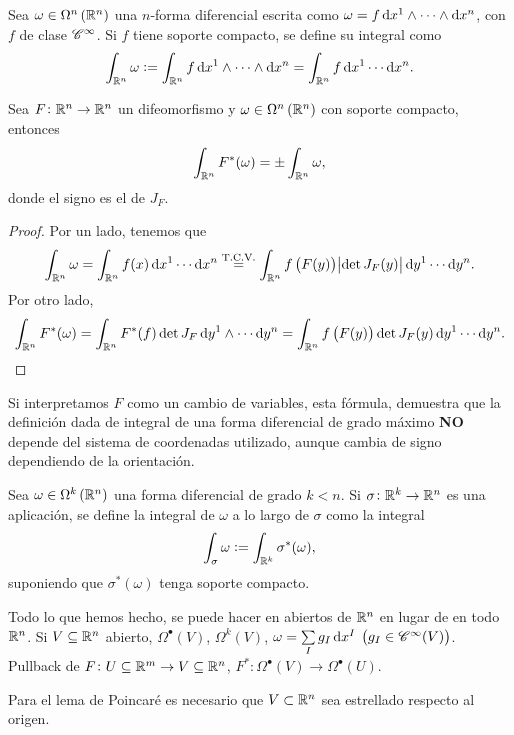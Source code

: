\begin{defi}
    Sea $\omega \in \Omega^n\left( \mathbb{R}^n \right)$ una $n$-forma diferencial escrita como $\omega = f \dif x^1 \wedge \cdots \wedge \dif x^n$,
    con $f$ de clase $\mathscr{C}^\infty$. Si $f$ tiene soporte compacto, se define su integral como
    \[
        \int_{\real^n} \omega := \int_{\real^n} f\dif x^1 \wedge \cdots \wedge \dif x^n = \int_{\real^n} f \dif x^1 \cdots \dif x^n.
    \]
\end{defi}

\begin{prop}
    Sea $F \colon \mathbb{R}^n \to \mathbb{R}^n$ un difeomorfismo y $\omega \in \Omega^n\left( \mathbb{R}^n \right)$ con soporte compacto, entonces
    \[
        \int_{\mathbb{R}^n} F^\ast(\omega) = \pm \int_{\mathbb{R}^n} \omega,
    \]
    donde el signo es el de $J_F$.
\end{prop}

\begin{proof}
    Por un lado, tenemos que
    \[
        \int_{\real^n} \omega = \int_{\real^n} f(x) \dif x^1 \cdots \dif x^n \stackrel{\text{T.C.V.}}{=} \int_{\real^n}
        f\left( F(y) \right) \abs{\det J_F(y)} \dif y^1 \cdots \dif y^n.
    \]
    Por otro lado,
    \[
        \int_{\real^n} F^\ast(\omega) = \int_{\real^n} F^\ast (f) \det J_F \dif y^1 \wedge \cdots \dif y^n =
        \int_{\real^n} f\left( F(y) \right) \det J_F(y) \dif y^1 \cdots \dif y^n.
    \]
\end{proof}

\begin{obs}
    Si interpretamos $F$ como un cambio de variables, esta fórmula, demuestra que la definición dada de integral de una forma diferencial
    de grado máximo \textbf{NO} depende del sistema de coordenadas utilizado, aunque cambia de signo dependiendo de la orientación.
\end{obs}

\begin{defi}
    Sea $\omega \in \Omega^k\left( \mathbb{R}^n \right)$ una forma diferencial de grado $k < n$. Si $\sigma \colon \mathbb{R}^k \to \mathbb{R}^n$ es
    una aplicación, se define la integral de $\omega$ a lo largo de $\sigma$ como la integral
    \[
        \int_{\sigma} \omega := \int_{\mathbb{R}^k} \sigma^\ast(\omega),
    \]
    suponiendo que $\sigma^\ast(\omega)$ tenga soporte compacto.
\end{defi}

\begin{obs}
    Todo lo que hemos hecho, se puede hacer en abiertos de $\mathbb{R}^n$ en lugar de en todo $\mathbb{R}^n$. Si $V \subseteq \mathbb{R}^n$ abierto,
    $\Omega^\bullet(V)$, $\Omega^k(V)$, $\omega = \sum\limits_I g_I \dif x^I$ $\left( g_I \in \mathscr{C}^\infty(V) \right)$.
    Pullback de $F \colon U \subseteq \mathbb{R}^m \to V \subseteq \mathbb{R}^n$, $F^\ast \colon \Omega^\bullet (V) \to \Omega^\bullet (U)$.

    Para el lema de Poincar\'e es necesario que $V \subset \mathbb{R}^n$ sea estrellado respecto al origen.
\end{obs}

